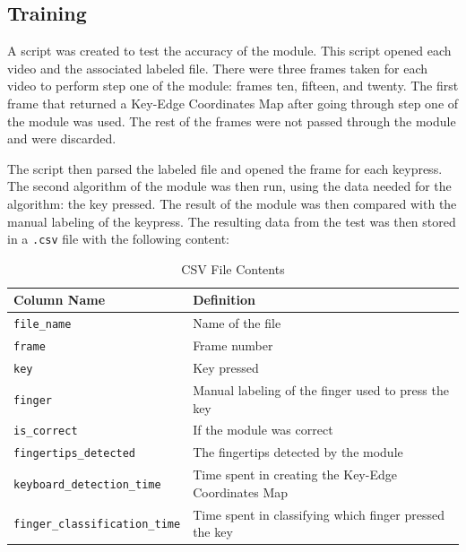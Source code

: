 \documentclass{report}
\begin{document}
\subsection{Training}
A script was created to test the accuracy of the module. This script opened each
video and the associated labeled file. There were three frames taken for each
video to perform step one of the module: frames ten, fifteen, and twenty. The
first frame that returned a Key-Edge Coordinates Map after going through step
one of the module was used. The rest of the frames were not passed through the
module and were discarded.

The script then parsed the labeled file and opened the frame for each keypress.
The second algorithm of the module was then run, using the data needed for the
algorithm: the key pressed. The result of the module was then compared with the
manual labeling of the keypress. The resulting data from the test was then
stored in a \texttt{.csv} file with the following content:

\begin{table}[H]
	\small
	\centering
	\caption{\label{tab:csv-output}CSV File Contents}
	\begin{tabular}{ p{} p{} }
		\toprule
		Column Name                           & Definition                                             \\
		\midrule
		\texttt{file\_name}                   & Name of the file                                       \\
		\texttt{frame}                        & Frame number                                           \\
		\texttt{key}                          & Key pressed                                            \\
		\texttt{finger}                       & Manual labeling of the finger used to press the key    \\
		\texttt{is\_correct}                  & If the module was correct                              \\
		\texttt{fingertips\_detected}         & The fingertips detected by the module                  \\
		\texttt{keyboard\_detection\_time}    & Time spent in creating the Key-Edge Coordinates Map    \\
		\texttt{finger\_classification\_time} & Time spent in classifying which finger pressed the key \\
		\bottomrule
	\end{tabular}
\end{table}
\end{document}
